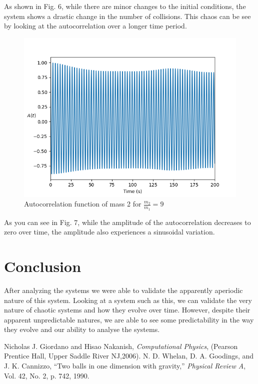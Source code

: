 \documentclass[pra,twocolumn,showpacs,amsmath,amssymb]{revtex4-2}
\begin{document}
As shown in Fig. 6, while there are minor changes to the initial conditions, the system shows a drastic change in the number of collisions. This chaos can be see by looking at the autocorrelation over a longer time period.

\begin{figure}[t!]
\includegraphics[scale=0.50]{corr3.png}
\caption{Autocorrelation function of mass 2 for \(\frac{m_2}{m_1} = 9\)}\label{autocorr9}
\end{figure}

\par As you can see in Fig. 7, while the amplitude of the autocorrelation decreases to zero over time, the amplitude also experiences a sinusoidal variation.

\section{Conclusion} \label{sec:conclusion}

After analyzing the systems we were able to validate the apparently aperiodic nature of this system. Looking at a system such as this, we can validate the very nature of chaotic systems and how they evolve over time. However, despite their apparent unpredictable natures, we are able to see some predictability in the way they evolve and our ability to analyse the systems.

\begin{thebibliography}{9}
\bibitem{}Nicholas J. Giordano and Hisao Nakanish, \emph{Computational Physics}, (Pearson Prentice Hall, Upper Saddle River NJ,2006).
\bibitem{}N. D. Whelan, D. A. Goodings, and J. K. Cannizzo, “Two balls in one dimension with gravity,” \emph{Physical Review A}, Vol. 42, No. 2, p. 742, 1990.
\end{thebibliography}
\end{document}
